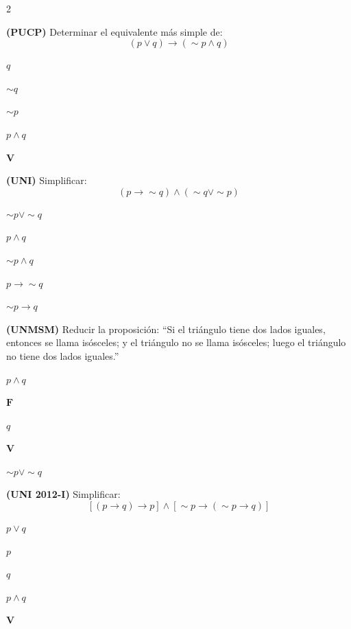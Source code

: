 \begin{multicols}{2}

\ejercicio \textbf{(PUCP)} Determinar el equivalente más
simple de:
\[
  (p \vee q) \rightarrow (\sim p \wedge q)
\]
\begin{alternativas}
  \item $q$
  \item $\sim q$
  \item $\sim p$
  \item $p \wedge q$
  \item $\mathbf{V}$
\end{alternativas}
\vspace{0.3cm}

\ejercicio \textbf{(UNI)} Simplificar:
\[
  (p \rightarrow \sim q) \wedge (\sim q \vee \sim p)
\]
\begin{alternativas}
  \item $\sim p \vee \sim q$
  \item $p \wedge q$
  \item $\sim p \wedge q$
  \item $p \rightarrow \sim q$
  \item $\sim p \rightarrow q$
\end{alternativas}
\vspace{0.3cm}

\ejercicio \textbf{(UNMSM)} Reducir la proposición:
``Si el triángulo tiene dos lados iguales, entonces
se llama isósceles; y el triángulo no se llama
isósceles; luego el triángulo no tiene dos lados
iguales.''
\begin{alternativas}
  \item $p \wedge q$
  \item $\mathbf{F}$
  \item $q$
  \item $\mathbf{V}$
  \item $\sim p \vee \sim q$
\end{alternativas}
\vspace{0.3cm}

\ejercicio \textbf{(UNI 2012-I)} Simplificar:
\[
  [(p \rightarrow q) \rightarrow p] \wedge
  [\sim p \rightarrow (\sim p \rightarrow q)]
\]
\begin{alternativas}
  \item $p \vee q$
  \item $p$
  \item $q$
  \item $p \wedge q$
  \item $\mathbf{V}$
\end{alternativas}
\vspace{0.3cm}


\end{multicols}
